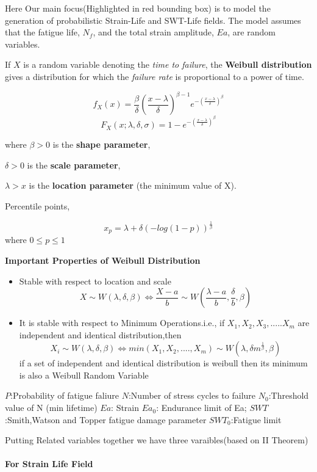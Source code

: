 \documentclass[11pt]{article}
\begin{document}
Here Our main focus(Highlighted in red bounding box) is to model the
generation of probabilistic Strain-Life and SWT-Life fields. The model
assumes that the fatigue life, \(N_f\), and the total strain amplitude,
\(Ea\), are random variables.

If \(X\) is a random variable denoting the \emph{time to failure}, the
\textbf{Weibull distribution} gives a distribution for which the
\emph{failure rate} is proportional to a power of time.

\[
f_X(x) = 
\frac{\beta}{\delta}(\frac{x-\lambda}{\delta})^{\beta-1}e^{-(\frac{x-\lambda}{\delta})^\beta}
\] \[
F_X(x;\lambda,\delta,\sigma) = 1-e^{-({\frac{x-\lambda}{\delta}})^\beta}
\]

where \(\beta > 0\) is the \textbf{shape parameter},

\(\delta > 0\) is the \textbf{scale parameter},

\(\lambda > x\) is the \textbf{location parameter} (the minimum value of
X).

Percentile points,

\[
x_p = \lambda + \delta(-log(1-p))^{\frac{1}{\beta}}
\] where \(0\leq p\leq 1\)

\textbf{Important Properties of Weibull Distribution}

\begin{itemize}
\item
  Stable with respect to location and scale \[
  X \sim W(\lambda,\delta,\beta) \iff \frac{X-a}{b} \sim W(\frac{\lambda-a}{b},\frac{\delta}{b},\beta)
  \]
\item
  It is stable with respect to Minimum Operations.i.e., if
  \(X_1,X_2,X_3,.....X_m\) are independent and identical
  distribution,then \[
  X_i\sim W(\lambda,\delta,\beta) \iff min(X_1,X_2,....,X_m) \sim W(\lambda,\delta m^{\frac{1}{\beta}},\beta)
  \] if a set of independent and identical distribution is weibull then
  its minimum is also a Weibull Random Variable
\end{itemize}

\(P\):Probability of fatigue faliure \(N\):Number of stress cycles to
failure \(N_0\):Threshold value of N (min lifetime) \(Ea\): Strain
\(Ea_0\): Endurance limit of Ea; \(SWT\):Smith,Watson and Topper fatigue
damage parameter \(SWT_0\):Fatigue limit

Putting Related variables together we have three varaibles(based on II
Theorem)

\hypertarget{for-strain-life-field}{%
\paragraph{For Strain Life Field}\label{for-strain-life-field}}
\end{document}
